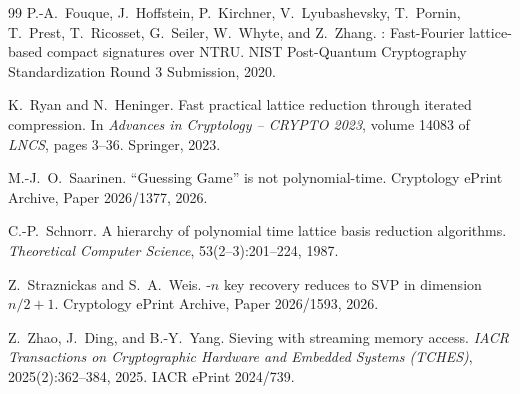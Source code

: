 \documentclass[11pt,a4paper]{article}
\theoremstyle{definition}
\begin{document}
\begin{thebibliography}{99}
P.-A.~Fouque, J.~Hoffstein, P.~Kirchner, V.~Lyubashevsky, T.~Pornin, T.~Prest, T.~Ricosset, G.~Seiler, W.~Whyte, and Z.~Zhang.
: Fast-Fourier lattice-based compact signatures over {NTRU}.
\newblock NIST Post-Quantum Cryptography Standardization Round 3 Submission, 2020.

K.~Ryan and N.~Heninger.
\newblock Fast practical lattice reduction through iterated compression.
\newblock In \emph{Advances in Cryptology -- CRYPTO 2023}, volume 14083 of \emph{LNCS}, pages 3--36. Springer, 2023.

M.-J.~O.~Saarinen.
 ``{G}uessing {G}ame'' is not polynomial-time.
\newblock Cryptology ePrint Archive, Paper 2026/1377, 2026.

C.-P.~Schnorr.
\newblock A hierarchy of polynomial time lattice basis reduction algorithms.
\newblock \emph{Theoretical Computer Science}, 53(2--3):201--224, 1987.

Z.~Straznickas and S.~A.~Weis.
-$n$ key recovery reduces to {SVP} in dimension $n/2+1$.
\newblock Cryptology ePrint Archive, Paper 2026/1593, 2026.

Z.~Zhao, J.~Ding, and B.-Y.~Yang.
\newblock Sieving with streaming memory access.
\newblock \emph{IACR Transactions on Cryptographic Hardware and Embedded Systems (TCHES)}, 2025(2):362--384, 2025. IACR ePrint 2024/739.

\end{thebibliography}
\end{document}
